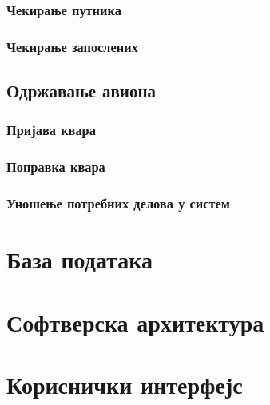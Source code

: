 \documentclass{article}
\begin{document}
\subsubsection{Чекирање путника}

\subsubsection{Чекирање запослених}

\subsection{Одржавање авиона}

\subsubsection{Пријава квара}

\subsubsection{Поправка квара}

\subsubsection{Уношење потребних делова у систем}

\section{База података}

\section{Софтверска архитектура}

\section{Кориснички интерфејс}
\end{document}
